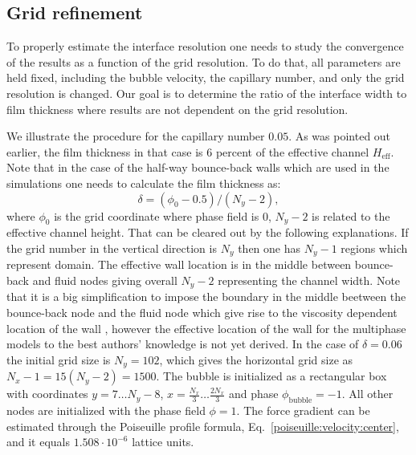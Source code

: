 \documentclass{article}
\begin{document}
\subsection{Grid refinement}
To properly estimate the interface resolution one needs to study the convergence
of the results as a function of the grid resolution. To do that, all parameters are held fixed,
including the bubble velocity, the capillary number, and only the grid
resolution is changed. Our goal is to determine the ratio of the interface width to 
film thickness where results are not dependent on the grid resolution.

We illustrate the procedure for the capillary number
$0.05$. As was pointed out earlier, the film thickness in that case is $6$ percent of the effective
channel $H_{\mathrm{eff}}$.
Note that in the case of the half-way bounce-back walls \cite{yu} which are used in the
simulations one needs to calculate the film thickness as:
\begin{equation}
\delta=(\phi_0-0.5)/(N_y-2),
\end{equation}
where $\phi_0$ is the grid coordinate where phase field is $0$, $N_y-2$
is related to the effective channel height. That can be cleared out by the following explanations.
If the grid number in the vertical direction is $N_y$ then one has $N_y-1$ regions which represent
domain. The effective wall location is in the middle between bounce-back and fluid nodes giving
overall $N_y-2$ representing the channel width. Note that it is a big
simplification to impose the boundary in the middle beetween the bounce-back
node and the fluid node which give rise to the viscosity dependent location of
the wall \cite{ginzburg-multireflection}, however the effective location of the wall for the
multiphase models to the best authors' knowledge is not yet derived. In the case of $\delta=0.06$
the
initial grid size is $N_y=102$, which gives the horizontal grid size as $N_x-1=15(N_y-2)=1500$.
The bubble is initialized as a rectangular box with coordinates
$y=7\dots N_y-8$, $x=\frac{N_x}{3}\dots \frac{2 N_x}{3}$ and phase
$\phi_{\mathrm{bubble}}=-1$. All other nodes are initialized with the phase field
$\phi=1$. The force gradient can be estimated through the Poiseuille
profile formula, Eq.~\ref{poiseuille:velocity:center}, and it equals
$1.508 \cdot 10^{-6}$ lattice units.
\end{document}
